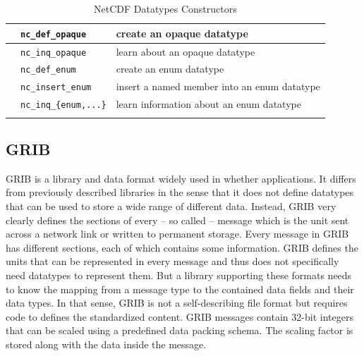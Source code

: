 \documentclass{../../template/esiwace-report}
\begin{document}
\begin{longtable}{|>{\centering\arraybackslash} m{1.7cm} | >{\centering\arraybackslash} m{4.5cm} | >{\centering\arraybackslash} m{5cm} |}
                                             & \small \texttt{nc\_def\_opaque}                & \small create an opaque datatype                      \\ \cline{2-3}
                                             & \small \texttt{nc\_inq\_opaque}                & \small learn about an opaque datatype                 \\ \hline
        \multirow{3}{1.7cm}{\centering \small Enum} %
                                             & \small \texttt{nc\_def\_enum}                  & \small create an enum datatype                        \\ \cline{2-3}
                                             & \small \texttt{nc\_insert\_enum}               & \small insert a named member into an enum datatype    \\ \cline{2-3}
                                             & \small \texttt{nc\_inq\_\{enum,...\}}          & \small learn information about an enum datatype       \\ \hline
        \caption{NetCDF Datatypes Constructors}
        \label{table: netcdf-constr}
\end{longtable}

\newpage



\subsection{GRIB}

GRIB is a library and data format widely used in whether applications. It differs from previously described libraries in the sense that it does not define datatypes that can be used to store a wide range of different data. 
Instead, GRIB very clearly defines the sections of every -- so called -- message which is the unit sent across a network link or written to permanent storage.
Every message in GRIB has different sections, each of which contains some information. 
GRIB defines the units that can be represented in every message and thus does not specifically need datatypes to represent them.
But a library supporting these formats needs to know the mapping from a message type to the contained data fields and their data types.
In that sense, GRIB is not a self-describing file format but requires code to defines the standardized content.
GRIB messages contain 32-bit integers that can be scaled using a predefined data packing schema. The scaling factor is stored along with the data inside the message.
\end{document}
